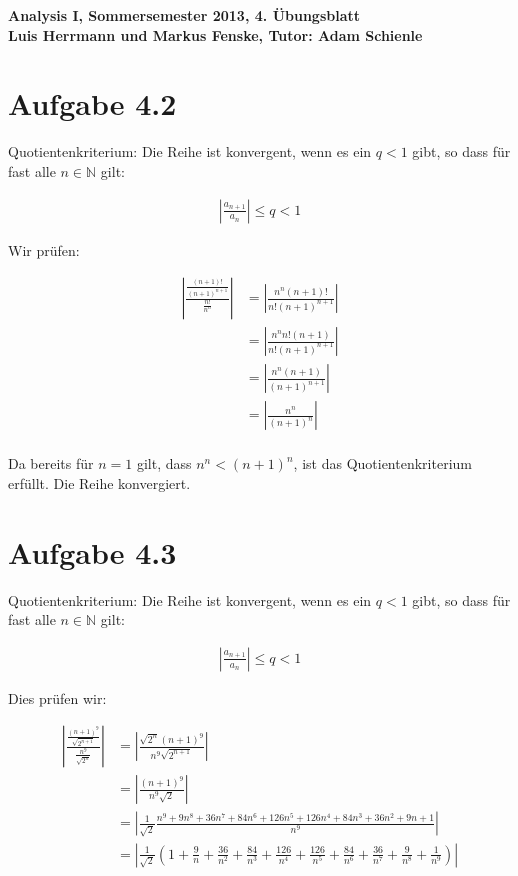 \documentclass[a4paper,german,12pt,smallheadings]{scrartcl}
\begin{document}
\begin{center}
\bfseries %
\sffamily %
\vspace{-40pt}
Analysis I, Sommersemester 2013, 4. Übungsblatt \\
Luis Herrmann und Markus Fenske, Tutor: Adam Schienle
\vspace{-10pt}
\end{center}

\section*{Aufgabe 4.2}
Quotientenkriterium: Die Reihe ist konvergent, wenn es ein $q < 1$ gibt, so
dass für fast alle $n \in \mathbb{N}$ gilt:

\begin{align*}
  \left| \frac{a_{n+1}}{a_n} \right| \le q < 1
\end{align*}

Wir prüfen:

\begin{align*}
  \left| \frac{\frac{(n+1)!}{(n+1)^{n+1}}}{\frac{n!}{n^n}} \right| &= \left| \frac{n^n(n+1)!}{n!(n+1)^{n+1}} \right| \\ 
  &= \left| \frac{n^n n! (n+1)}{n!(n+1)^{n+1}} \right| \\
  &= \left| \frac{n^n (n+1)}{(n+1)^{n+1}} \right| \\
  &= \left| \frac{n^n}{(n+1)^{n}} \right| \\
\end{align*}

Da bereits für $n=1$ gilt, dass $n^n < (n+1)^n$, ist das Quotientenkriterium
erfüllt. Die Reihe konvergiert.


\section*{Aufgabe 4.3}
Quotientenkriterium: Die Reihe ist konvergent, wenn es ein $q < 1$ gibt, so
dass für fast alle $n \in \mathbb{N}$ gilt:

\begin{align*}
  \left| \frac{a_{n+1}}{a_n} \right| \le q < 1
\end{align*}

Dies prüfen wir:

\begin{align*}
  \left| \frac{\frac{(n+1)^9}{\sqrt{2^{n+1}}}}{\frac{n^9}{\sqrt{2^n}}} \right| &= \left| \frac{\sqrt{2^n} (n+1)^9}{n^9 \sqrt{2^{n+1}}} \right| \\
  &= \left| \frac{(n+1)^9}{n^9 \sqrt{2}} \right| \\
  &= \left| \frac{1}{\sqrt{2}} \frac{n^9+9n^8+36n^7+84n^6+126n^5+126n^4+84n^3+36n^2+9n+1}{n^9} \right| \\
  &= \left| \frac{1}{\sqrt{2}} \left(1 + \frac{9}{n} + \frac{36}{n^2} + \frac{84}{n^3} + \frac{126}{n^4} + \frac{126}{n^5} + \frac{84}{n^6} + \frac{36}{n^7} + \frac{9}{n^8} + \frac{1}{n^9}\right) \right| \\
\end{align*}
\end{document}
